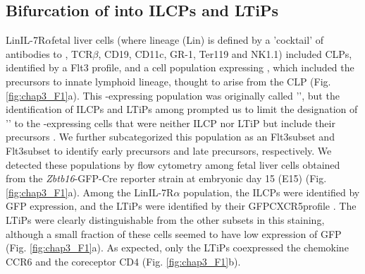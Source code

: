 \subsection{Bifurcation of \aLPs into ILCPs and LTiPs}
Lin\UM IL-7R$\alpha$\UP fetal liver cells (where lineage (Lin) is defined by a 'cocktail' of antibodies to \CDte, TCR$\beta$, CD19, CD11c, GR-1, Ter119 and NK1.1) included CLPs, identified by a Flt3\UP \ab\UM{} profile, and a cell population expressing \ab, which included the precursors to innate lymphoid lineage, thought to arise from the CLP (Fig. \ref{fig:chap3_F1}a). This \ab-expressing population was originally called '\aLP', but the identification of ILCPs and LTiPs among \aLPs prompted us to limit the designation of '\aLP' to the \ab-expressing cells that were neither ILCP nor LTiP but include their precursors \cite{serafini2015,moro2015}. We further subcategorized this \aLP population as an Flt3\UP subset and Flt3\UM subset to identify early precursors and late precursors, respectively. We detected these populations by flow cytometry among fetal liver cells obtained from the \textit{Zbtb16}-GFP-Cre reporter strain at embryonic day 15 (E15) (Fig. \ref{fig:chap3_F1}a). Among the Lin\UM IL-7R$\alpha$\UP \ab\UP{} population, the ILCPs were identified by GFP expression, and the LTiPs were identified by their GFP\UM CXCR5\UP profile \cite{constantinides2014,cherrier2012}. The LTiPs were clearly distinguishable from the other subsets in this staining, although a small fraction of these cells seemed to have low expression of GFP (Fig. \ref{fig:chap3_F1}a). As expected, only the LTiPs coexpressed the chemokine CCR6 and the coreceptor CD4 (Fig. \ref{fig:chap3_F1}b).


